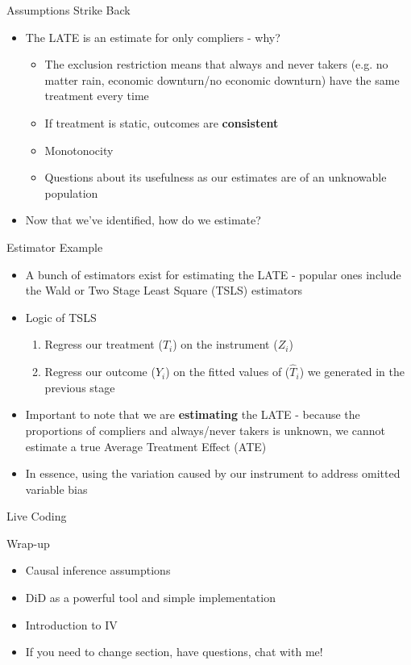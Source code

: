 \documentclass[]{beamer}
\begin{document}
\begin{frame}{Assumptions Strike Back}
	
	\begin{itemize}
		\item The LATE is an estimate for only compliers - why? 
		\begin{itemize}
			\item The exclusion restriction means that always and never takers (e.g. no matter rain, economic downturn/no economic downturn) have the same treatment every time 
			\item If treatment is static, outcomes are \textbf{consistent}
			\item Monotonocity 
			\item Questions about its usefulness as our estimates are of an unknowable population 
		\end{itemize}
		\item Now that we've identified, how do we estimate? 
	\end{itemize}
\end{frame}

\begin{frame}{Estimator Example}

	\begin{itemize}
		\item A bunch of estimators exist for estimating the LATE - popular ones include the Wald or Two Stage Least Square (TSLS) estimators 
		\item Logic of TSLS 
		\begin{enumerate}
			\item Regress our treatment ($T_i$) on the instrument ($Z_i$)
			\item Regress our outcome ($Y_i$) on the fitted values of ($\widehat T_i$) we generated in the previous stage
		\end{enumerate}
		\item Important to note that we are \textbf{estimating} the LATE - because the proportions of compliers and always/never takers is unknown, we cannot estimate a true Average Treatment Effect (ATE) 
		\item In essence, using the variation caused by our instrument to address omitted variable bias
	\end{itemize}	
\end{frame}

\begin{frame}{Live Coding}

	
\end{frame}

\begin{frame}{Wrap-up}
	\begin{itemize}
		\item Causal inference assumptions 
		\item DiD as a powerful tool and simple implementation 
		\item Introduction to IV 
		\item If you need to change section, have questions, chat with me!
	\end{itemize}
\end{frame}
\end{document}

